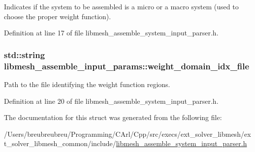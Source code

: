 Indicates if the system to be assembled is a micro or a macro system (used to choose the proper weight function). 



Definition at line 17 of file libmesh\+\_\+assemble\+\_\+system\+\_\+input\+\_\+parser.\+h.

\hypertarget{structlibmesh__assemble__input__params_a9b91599c97b26e5446f26440f74b896f}{}
\subsubsection[{weight\+\_\+domain\+\_\+idx\+\_\+file}]{\setlength{\rightskip}{0pt plus 5cm}std\+::string libmesh\+\_\+assemble\+\_\+input\+\_\+params\+::weight\+\_\+domain\+\_\+idx\+\_\+file}\label{structlibmesh__assemble__input__params_a9b91599c97b26e5446f26440f74b896f}


Path to the file identifying the weight function regions. 



Definition at line 20 of file libmesh\+\_\+assemble\+\_\+system\+\_\+input\+\_\+parser.\+h.



The documentation for this struct was generated from the following file\+:\begin{DoxyCompactItemize}
\item 
/\+Users/breubreubreu/\+Programming/\+C\+Arl/\+Cpp/src/execs/ext\+\_\+solver\+\_\+libmesh/ext\+\_\+solver\+\_\+libmesh\+\_\+common/include/\hyperlink{libmesh__assemble__system__input__parser_8h}{libmesh\+\_\+assemble\+\_\+system\+\_\+input\+\_\+parser.\+h}\end{DoxyCompactItemize}

